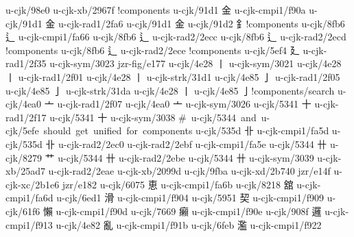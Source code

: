\begin{multicols}{2}
u-cjk/98e0	{\cjk{}}	u-cjk-xb/2967f	{}!components 
u-cjk/91d1	{\cjk{}金}	u-cjk-cmpi1/f90a	{} 
u-cjk/91d1	{\cjk{}金}	u-cjk-rad1/2fa6	{} 
u-cjk/91d1	{\cjk{}金}	u-cjk/91d2	{\cjk{}釒}!components 
u-cjk/8fb6	{\cjk{}辶}	u-cjk-cmpi1/fa66	{} 
u-cjk/8fb6	{\cjk{}辶}	u-cjk-rad2/2ecc	{} 
u-cjk/8fb6	{\cjk{}辶}	u-cjk-rad2/2ecd	{}!components 
u-cjk/8fb6	{\cjk{}辶}	u-cjk-rad2/2ece	{}!components 
u-cjk/5ef4	{\cjk{}廴}	u-cjk-rad1/2f35	{} 
u-cjk-sym/3023	{\cjk{}}	jzr-fig/e177	{} 
u-cjk/4e28	{\cjk{}丨}	u-cjk-sym/3021	{} 
u-cjk/4e28	{\cjk{}丨}	u-cjk-rad1/2f01	{} 
u-cjk/4e28	{\cjk{}丨}	u-cjk-strk/31d1	{} 
u-cjk/4e85	{\cjk{}亅}	u-cjk-rad1/2f05	{} 
u-cjk/4e85	{\cjk{}亅}	u-cjk-strk/31da	{} 
u-cjk/4e28	{\cjk{}丨}	u-cjk/4e85	{\cjk{}亅}!components/search 
u-cjk/4ea0	{\cjk{}亠}	u-cjk-rad1/2f07	{} 
u-cjk/4ea0	{\cjk{}亠}	u-cjk-sym/3026	{} 
u-cjk/5341	{\cjk{}十}	u-cjk-rad1/2f17	{} 
u-cjk/5341	{\cjk{}十}	u-cjk-sym/3038	{} 
\# u-cjk/5344 and u-cjk/5efe should get unified for components 
u-cjk/535d	{\cjk{}卝}	u-cjk-cmpi1/fa5d	{} 
u-cjk/535d	{\cjk{}卝}	u-cjk-rad2/2ec0	{} 
u-cjk-rad2/2ebf	{	}u-cjk-cmpi1/fa5e	{} 
u-cjk/5344	{\cjk{}卄}	u-cjk/8279	{\cjk{}艹} 
u-cjk/5344	{\cjk{}卄}	u-cjk-rad2/2ebe	{} 
u-cjk/5344	{\cjk{}卄}	u-cjk-sym/3039	{} 
u-cjk-xb/25ad7	{\cjk{}}	u-cjk-rad2/2eae	{} 
u-cjk-xb/2099d	{	}u-cjk/9fba	{\cjk{}} 
u-cjk-xd/2b740	{	}jzr/e14f	{} 
u-cjk-xc/2b1e6	{	}jzr/e182	{} 
u-cjk/6075	{\cjk{}恵}	u-cjk-cmpi1/fa6b	{} 
u-cjk/8218	{\cjk{}舘}	u-cjk-cmpi1/fa6d	{} 
u-cjk/6ed1	{\cjk{}滑}	u-cjk-cmpi1/f904	{} 
u-cjk/5951	{\cjk{}契}	u-cjk-cmpi1/f909	{} 
u-cjk/61f6	{\cjk{}懶}	u-cjk-cmpi1/f90d	{} 
u-cjk/7669	{\cjk{}癩}	u-cjk-cmpi1/f90e	{} 
u-cjk/908f	{\cjk{}邏}	u-cjk-cmpi1/f913	{} 
u-cjk/4e82	{\cjk{}亂}	u-cjk-cmpi1/f91b	{} 
u-cjk/6feb	{\cjk{}濫}	u-cjk-cmpi1/f922	{} 

\end{multicols}

